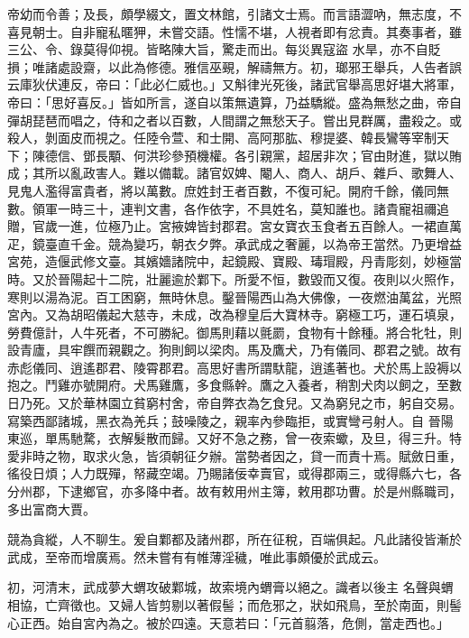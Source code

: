 \begin{pinyinscope}
 帝幼而令善；及長，頗學綴文，置文林館，引諸文士焉。而言語澀吶，無志度，不喜見朝士。自非寵私暱狎，未嘗交語。性懦不堪，人視者即有忿責。其奏事者，雖三公、令、錄莫得仰視。皆略陳大旨，驚走而出。每災異寇盜
 水旱，亦不自貶損；唯諸處設齋，以此為修德。雅信巫覡，解禱無方。初，瑯邪王舉兵，人告者誤云庫狄伏連反，帝曰：「此必仁威也。」又斛律光死後，諸武官舉高思好堪大將軍，帝曰：「思好喜反。」皆如所言，遂自以策無遺算，乃益驕縱。盛為無愁之曲，帝自彈胡琵琶而唱之，侍和之者以百數，人間謂之無愁天子。嘗出見群厲，盡殺之。或殺人，剝面皮而視之。任陸令萱、和士開、高阿那肱、穆提婆、韓長鸞等宰制天下；陳德信、鄧長顒、何洪珍參預機權。各引親黨，超居非次；官由財進，獄以賄成；其所以亂政害人。難以備載。諸官奴婢、閹人、商人、胡戶、雜戶、歌舞人、
 見鬼人濫得富貴者，將以萬數。庶姓封王者百數，不復可紀。開府千餘，儀同無數。領軍一時三十，連判文書，各作依字，不具姓名，莫知誰也。諸貴寵祖禰追贈，官歲一進，位極乃止。宮掖婢皆封郡君。宮女寶衣玉食者五百餘人。一裙直萬疋，鏡臺直千金。競為變巧，朝衣夕弊。承武成之奢麗，以為帝王當然。乃更增益宮苑，造偃武修文臺。其嬪嬙諸院中，起鏡殿、寶殿、瑇瑁殿，丹青彫刻，妙極當時。又於晉陽起十二院，壯麗逾於鄴下。所愛不恒，數毀而又復。夜則以火照作，寒則以湯為泥。百工困窮，無時休息。鑿晉陽西山為大佛像，一夜燃油萬盆，光照
 宮內。又為胡昭儀起大慈寺，未成，改為穆皇后大寶林寺。窮極工巧，運石填泉，勞費億計，人牛死者，不可勝紀。御馬則藉以氈罽，食物有十餘種。將合牝牡，則設青廬，具牢饌而親觀之。狗則飼以梁肉。馬及鷹犬，乃有儀同、郡君之號。故有赤彪儀同、逍遙郡君、陵霄郡君。高思好書所謂馱龍，逍遙著也。犬於馬上設褥以抱之。鬥雞亦號開府。犬馬雞鷹，多食縣幹。鷹之入養者，稍割犬肉以飼之，至數日乃死。又於華林園立貧窮村舍，帝自弊衣為乞食兒。又為窮兒之市，躬自交易。寫築西鄙諸城，黑衣為羌兵；鼓噪陵之，親率內參臨拒，或實彎弓射人。自
 晉陽東巡，單馬馳騖，衣解髮散而歸。又好不急之務，曾一夜索蠍，及旦，得三升。特愛非時之物，取求火急，皆須朝征夕辦。當勢者因之，貸一而責十焉。賦斂日重，徭役日煩；人力既殫，帑藏空竭。乃賜諸佞幸賣官，或得郡兩三，或得縣六七，各分州郡，下逮鄉官，亦多降中者。故有敕用州主簿，敕用郡功曹。於是州縣職司，多出富商大賈。



 競為貪縱，人不聊生。爰自鄴都及諸州郡，所在征稅，百端俱起。凡此諸役皆漸於武成，至帝而增廣焉。然未嘗有有帷薄淫穢，唯此事頗優於武成云。



 初，河清末，武成夢大蝟攻破鄴城，故索境內蝟膏以絕之。識者以後主
 名聲與蝟相協，亡齊徵也。又婦人皆剪剔以著假髻；而危邪之，狀如飛鳥，至於南面，則髻心正西。始自宮內為之。被於四遠。天意若曰：「元首翦落，危側，當走西也。」




\end{pinyinscope}
